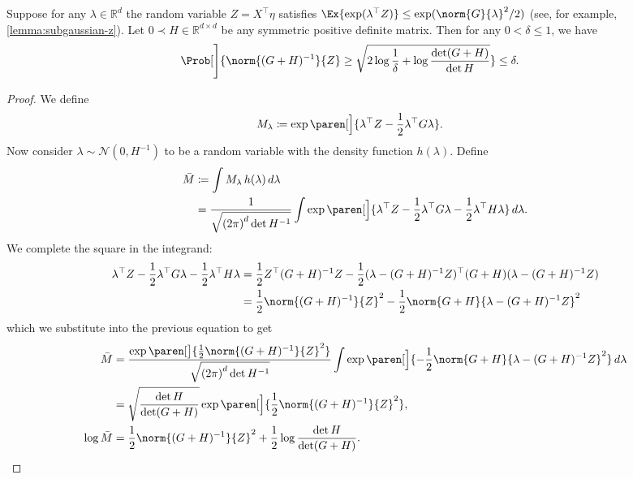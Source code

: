 \documentclass{article}
\newcommand{\defeq}{\coloneq}
\newcommand{\inv}[1]{#1^{-1}}
\newcommand{\Real}{\mathds{R}}
\DeclarePairedDelimiter{\paren}()
\providecommand\transp{\top}
\let\transpsymbol\transp
\renewcommand{\transp}[1]{#1^\transpsymbol}
\begin{document}
\begin{lemma}\label{lemma:z-norm-bounded-whp}
  Suppose for any $\lambda\in\Real^d$ the random variable
  $Z=\transp{X}\eta$ satisfies
  $\Ex{\exp(\transp{\lambda}Z)} \le \exp(\norm{G}{\lambda}^2/2)$ (see,
  for example, \cref{lemma:subgaussian-z}).  Let
  $0 \prec H \in \Real^{d\times d}$ be any symmetric positive definite
  matrix.  Then for any $0 < \delta \le 1$, we have
  \begin{align*}
    \Prob[\Bigg]{\norm{\inv{(G+H)}}{Z} \ge \sqrt{2\log\frac{1}{\delta} + \log\frac{\det(G+H)}{\det H}}} &\le \delta.
  \end{align*}

  \begin{proof}
    We define
    \begin{align*}
      M_\lambda &\defeq \exp\paren[\Big]{\transp{\lambda}Z - \frac{1}{2}\transp{\lambda}G\lambda}.
    \end{align*}
    Now consider $\lambda\sim\mathcal{N}(0, \inv{H})$ to be a random
    variable with the density function $h(\lambda)$.  Define
    \begin{align*}
      \bar{M}
      &\defeq \int M_\lambda \,h(\lambda)\,d\lambda \\
      &= \frac{1}{\sqrt{{(2\pi)}^d \det\inv{H}}} \int\exp\paren[\Big]{\transp{\lambda}Z
        - \frac{1}{2}\transp{\lambda}G\lambda
        - \frac{1}{2}\transp{\lambda}H\lambda
        } \,d\lambda.
    \end{align*}
    We complete the square in the integrand:
    \begin{align*}
      \transp{\lambda}Z - \frac{1}{2}\transp{\lambda}G\lambda - \frac{1}{2}\transp{\lambda}H\lambda
      &= \frac{1}{2}\transp{Z}\inv{(G+H)}Z - \frac{1}{2}\transp{(\lambda - \inv{(G+H)}Z)}(G+H)(\lambda-\inv{(G+H)}Z) \\
      &= \frac{1}{2} \norm{\inv{(G+H)}}{Z}^2 - \frac{1}{2}\norm{G+H}{\lambda-\inv{(G+H)}Z}^2
    \end{align*}
    which we substitute into the previous equation to get
    \begin{align*}
      \bar{M}
      &= \frac{\exp\paren[\big]{\frac{1}{2} \norm{\inv{(G+H)}}{Z}^2}}{\sqrt{{(2\pi)}^d \det\inv{H}}}
        \int \exp\paren[\Big]{-\frac{1}{2} \norm{G+H}{\lambda-\inv{(G+H)}Z}^2} \,d\lambda \\
      &= \sqrt{\frac{\det H}{\det(G+H)}} \exp\paren[\Big]{\frac{1}{2}\norm{\inv{(G+H)}}{Z}^2}, \\
      \log\bar{M} &= \frac{1}{2}\norm{\inv{(G+H)}}{Z}^2 + \frac{1}{2}\log\frac{\det H}{\det(G+H)}.

\end{align*}
\end{proof}
\end{lemma}
\end{document}
